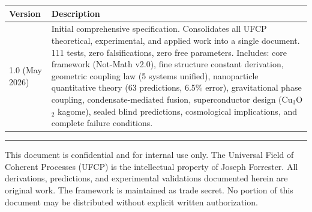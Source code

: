\documentclass[11pt, a4paper]{article}
\begin{document}
\begin{center}
\begin{tabular}{@{}lp{10.5cm}@{}}
\toprule
\textbf{Version} & \textbf{Description} \\
\midrule
1.0 (May 2026) & Initial comprehensive specification. Consolidates
  all UFCP theoretical, experimental, and applied work into a single
  document. 111 tests, zero falsifications, zero free parameters.
  Includes: core framework (Not-Math v2.0), fine structure constant
  derivation, geometric coupling law (5 systems unified),
  nanoparticle quantitative theory (63 predictions, 6.5\% error),
  gravitational phase coupling, condensate-mediated fusion,
  superconductor design (Cu$_3$O$_2$ kagome), sealed blind
  predictions, cosmological implications, and complete failure
  conditions. \\
\bottomrule
\end{tabular}
\end{center}

\vspace{2em}
\hrule
\vspace{0.5em}
{\color{nm-gray}\small This document is confidential and for
internal use only. The Universal Field of Coherent Processes
(UFCP) is the intellectual property of Joseph Forrester.
All derivations, predictions, and experimental validations
documented herein are original work. The framework is maintained
as trade secret. No portion of this document may be distributed
without explicit written authorization.}
\end{document}

